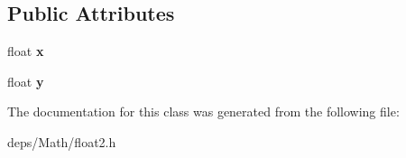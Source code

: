 \subsection*{Public Attributes}
\begin{DoxyCompactItemize}
\item 
\mbox{\label{class_float2_a9f4577102bc9a7bdf9355b5776301485}} 
float {\bfseries x}
\item 
\mbox{\label{class_float2_a53deb463e8335f53a8f5454c9c3c0503}} 
float {\bfseries y}
\end{DoxyCompactItemize}


The documentation for this class was generated from the following file\+:\begin{DoxyCompactItemize}
\item 
deps/\+Math/float2.\+h\end{DoxyCompactItemize}
